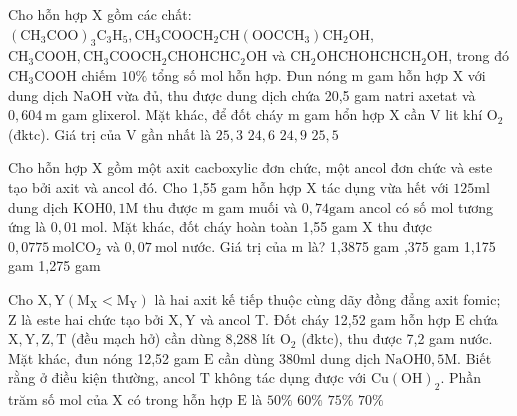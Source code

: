 \begin{vdex}
	Cho hỗn hợp $\mathrm{X}$ gồm các chất: $\left(\mathrm{CH}_3 \mathrm{COO}\right)_3 \mathrm{C}_3 \mathrm{H}_5, \mathrm{CH}_3 \mathrm{COOCH}_2 \mathrm{CH}\left(\mathrm{OOCCH}_3\right) \mathrm{CH}_2 \mathrm{OH}$, $\mathrm{CH}_3 \mathrm{COOH}, \mathrm{CH}_3 \mathrm{COOCH}_2 \mathrm{CHOHCH} \mathrm{C}_2 \mathrm{OH}$ và $\mathrm{CH}_2 \mathrm{OHCHOHCH} \mathrm{CH}_2 \mathrm{OH}$, trong đó $\mathrm{CH}_3 \mathrm{COOH}$ chiếm $10 \%$ tổng số mol hỗn hợp. Đun nóng $\mathrm{m}$ gam hỗn hợp $\mathrm{X}$ với dung dịch $\mathrm{NaOH}$ vừa đủ, thu được dung dịch chứa 20,5 gam natri axetat và $0,604 \mathrm{~m}$ gam glixerol. Mặt khác, để đốt cháy $\mathrm{m}$ gam hổn hợp $\mathrm{X}$ cần $\mathrm{V}$ lit khí $\mathrm{O}_2$ (đktc). Giá trị của $\mathrm{V}$ gần nhất là
	\choice
	{%
	\True	$25,3$
	}
	{%
		$24,6$	
	}
	{%
		$24,9$	
	}
	{%
		$25,5$	
	}
	\huongdan
	{%
		
		
	}
\end{vdex}
\begin{vdex}
	Cho hỗn hợp $\mathrm{X}$ gồm một axit cacboxylic đơn chức, một ancol đơn chức và este tạo bởi axit và ancol đó. Cho 1,55 gam hỗn hợp $\mathrm{X}$ tác dụng vừa hết với $125 \mathrm{ml}$ dung dịch $\mathrm{KOH} 0,1 \mathrm{M}$ thu được $\mathrm{m}$ gam muối và $0,74 \mathrm{gam}$ ancol có số mol tương ứng là $0,01 \mathrm{~mol}$. Mặt khác, đốt cháy hoàn toàn 1,55 gam $\mathrm{X}$ thu được $0,0775 \mathrm{~mol} \mathrm{CO}_2$ và $0,07 \mathrm{~mol}$ nước. Giá trị của $\mathrm{m}$ là?	
	\choice
	{%
		1,3875 gam
	}
	{%
	,375 gam	
	}
	{%
		1,175 gam	
	}
	{%
		1,275 gam	
	}
	\huongdan
	{%
		
		
	}
\end{vdex}
\begin{vdex}
	Cho $\mathrm{X}, \mathrm{Y}\left(\mathrm{M}_{\mathrm{X}}<\mathrm{M}_{\mathrm{Y}}\right)$ là hai axit kế tiếp thuộc cùng dãy đồng đẳng axit fomic; $\mathrm{Z}$ là este hai chức tạo bởi $\mathrm{X}, \mathrm{Y}$ và ancol T. Đốt cháy 12,52 gam hỗn hợp $\mathrm{E}$ chứa $\mathrm{X}, \mathrm{Y}, \mathrm{Z}, \mathrm{T}$ (đều mạch hở) cần dùng 8,288 lít $\mathrm{O}_2$ (đktc), thu được 7,2 gam nước. Mặt khác, đun nóng 12,52 gam $\mathrm{E}$ cần dùng $380 \mathrm{ml}$ dung dịch $\mathrm{NaOH} 0,5 \mathrm{M}$. Biết rằng ở điều kiện thường, ancol $\mathrm{T}$ không tác dụng được với $\mathrm{Cu}(\mathrm{OH})_2$. Phần trăm số $\mathrm{mol}$ của $\mathrm{X}$ có trong hỗn hợp $\mathrm{E}$ là
	\choice
	{%
		$50 \%$
	}
	{%
	\True	$60 \%$	
	}
	{%
		$75 \%$	
	}
	{%
		$70 \%$	
	}
	\huongdan
	{%
		
		
	}
\end{vdex}

